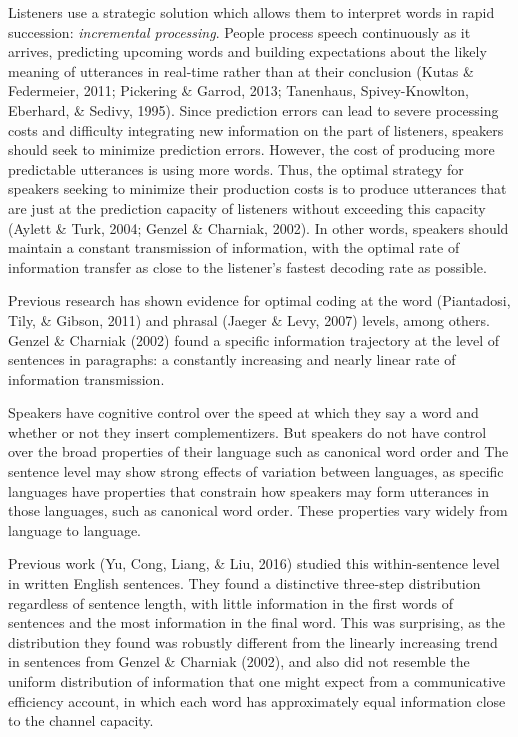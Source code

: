 \documentclass[10pt, letterpaper]{article}
\begin{document}
Listeners use a strategic solution which allows them to interpret words
in rapid succession: \emph{incremental processing}. People process
speech continuously as it arrives, predicting upcoming words and
building expectations about the likely meaning of utterances in
real-time rather than at their conclusion (Kutas \& Federmeier, 2011;
Pickering \& Garrod, 2013; Tanenhaus, Spivey-Knowlton, Eberhard, \&
Sedivy, 1995). Since prediction errors can lead to severe processing
costs and difficulty integrating new information on the part of
listeners, speakers should seek to minimize prediction errors. However,
the cost of producing more predictable utterances is using more words.
Thus, the optimal strategy for speakers seeking to minimize their
production costs is to produce utterances that are just at the
prediction capacity of listeners without exceeding this capacity (Aylett
\& Turk, 2004; Genzel \& Charniak, 2002). In other words, speakers
should maintain a constant transmission of information, with the optimal
rate of information transfer as close to the listener's fastest decoding
rate as possible.

Previous research has shown evidence for optimal coding at the word
(Piantadosi, Tily, \& Gibson, 2011) and phrasal (Jaeger \& Levy, 2007)
levels, among others. Genzel \& Charniak (2002) found a specific
information trajectory at the level of sentences in paragraphs: a
constantly increasing and nearly linear rate of information
transmission.

Speakers have cognitive control over the speed at which they say a word
and whether or not they insert complementizers. But speakers do not have
control over the broad properties of their language such as canonical
word order and The sentence level may show strong effects of variation
between languages, as specific languages have properties that constrain
how speakers may form utterances in those languages, such as canonical
word order. These properties vary widely from language to language.

Previous work (Yu, Cong, Liang, \& Liu, 2016) studied this
within-sentence level in written English sentences. They found a
distinctive three-step distribution regardless of sentence length, with
little information in the first words of sentences and the most
information in the final word. This was surprising, as the distribution
they found was robustly different from the linearly increasing trend in
sentences from Genzel \& Charniak (2002), and also did not resemble the
uniform distribution of information that one might expect from a
communicative efficiency account, in which each word has approximately
equal information close to the channel capacity.
\end{document}
